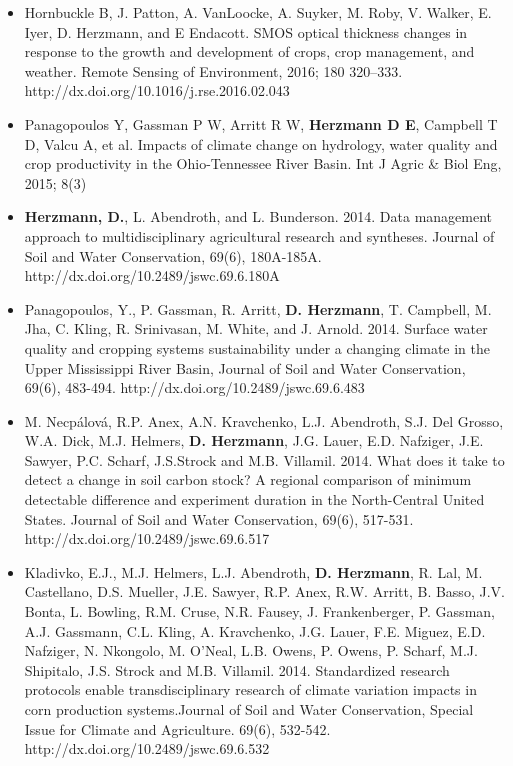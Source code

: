 \begin{itemize}
\item Hornbuckle B, J. Patton, A. VanLoocke, A. Suyker, M. Roby, V. Walker, E. Iyer, D. Herzmann, and E Endacott. SMOS optical thickness changes in response to the growth and development of crops, crop management, and weather. Remote Sensing of Environment, 2016; 180 320–333. http://dx.doi.org/10.1016/j.rse.2016.02.043
\item Panagopoulos Y, Gassman P W, Arritt R W, \textbf{Herzmann D E}, Campbell T D, Valcu A, et al.  Impacts of climate change on hydrology, water quality and crop productivity in the Ohio-Tennessee River Basin.  Int J Agric & Biol Eng, 2015; 8(3)
\item \textbf{Herzmann, D.}, L. Abendroth, and L. Bunderson. 2014. Data management approach to multidisciplinary agricultural research and syntheses. Journal of Soil and Water Conservation, 69(6), 180A-185A. http://dx.doi.org/10.2489/jswc.69.6.180A
\item Panagopoulos, Y., P. Gassman, R. Arritt, \textbf{D. Herzmann}, T. Campbell, M. Jha, C. Kling, R. Srinivasan, M. White, and J. Arnold. 2014. Surface water quality and cropping systems sustainability under a changing climate in the Upper Mississippi River Basin, Journal of Soil and Water Conservation, 69(6), 483-494. http://dx.doi.org/10.2489/jswc.69.6.483
\item M. Necpálová, R.P. Anex, A.N. Kravchenko, L.J. Abendroth, S.J. Del Grosso, W.A. Dick, M.J. Helmers, \textbf{D. Herzmann}, J.G. Lauer, E.D. Nafziger, J.E. Sawyer, P.C. Scharf, J.S.Strock and M.B. Villamil. 2014. What does it take to detect a change in soil carbon stock? A regional comparison of minimum detectable difference and experiment duration in the North-Central United States. Journal of Soil and Water Conservation, 69(6), 517-531. http://dx.doi.org/10.2489/jswc.69.6.517
\item Kladivko, E.J., M.J. Helmers, L.J. Abendroth, \textbf{D. Herzmann}, R. Lal, M. Castellano, D.S. Mueller, J.E. Sawyer, R.P. Anex, R.W. Arritt, B. Basso, J.V. Bonta, L. Bowling, R.M. Cruse, N.R. Fausey, J. Frankenberger, P. Gassman, A.J. Gassmann, C.L. Kling, A. Kravchenko, J.G. Lauer, F.E. Miguez, E.D. Nafziger, N. Nkongolo, M. O'Neal, L.B. Owens, P. Owens, P. Scharf, M.J. Shipitalo, J.S. Strock and M.B. Villamil. 2014. Standardized research protocols enable transdisciplinary research of climate variation impacts in corn production systems.Journal of Soil and Water Conservation, Special Issue for Climate and Agriculture. 69(6), 532-542. http://dx.doi.org/10.2489/jswc.69.6.532

\end{itemize}
